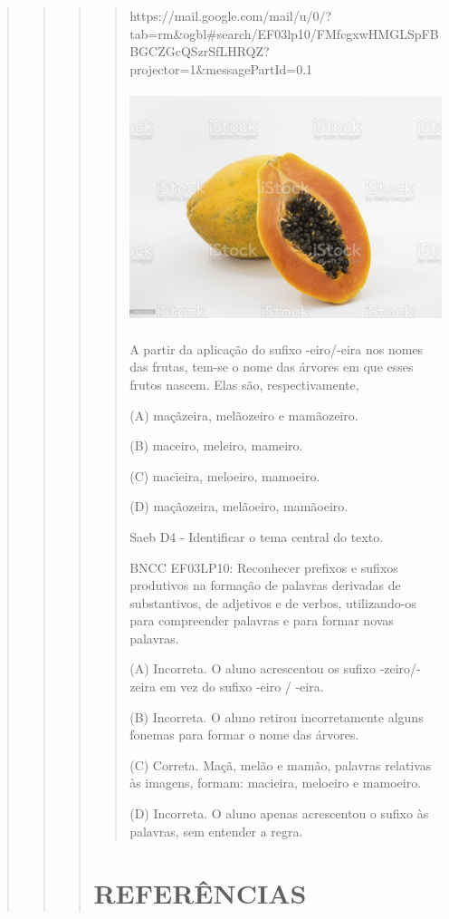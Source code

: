 \begin{quote}
\begin{quote}
\begin{quote}
\begin{quote}
https://mail.google.com/mail/u/0/?tab=rm\&ogbl\#search/EF03lp10/FMfcgxwHMGLSpFBBGCZGcQSzrSfLHRQZ?projector=1\&messagePartId=0.1

\includegraphics[width=3.76501in,height=2.67500in]{media/image40.jpeg}

A partir da aplicação do sufixo -eiro/-eira nos nomes das frutas, tem-se
o nome das árvores em que esses frutos nascem. Elas são,
respectivamente,

(A) maçãzeira, melãozeiro e mamãozeiro.

(B) maceiro, meleiro, mameiro.

(C) macieira, meloeiro, mamoeiro.

(D) maçãozeira, melãoeiro, mamãoeiro.

Saeb D4 - Identificar o tema central do texto.

BNCC EF03LP10: Reconhecer prefixos e sufixos produtivos na formação de
palavras derivadas de substantivos, de adjetivos e de verbos,
utilizando-os para compreender palavras e para formar novas palavras.

(A) Incorreta. O aluno acrescentou os sufixo -zeiro/-zeira em vez do
sufixo -eiro / -eira.

(B) Incorreta. O aluno retirou incorretamente alguns fonemas para formar
o nome das árvores.

(C) Correta. Maçã, melão e mamão, palavras relativas às imagens, formam:
macieira, meloeiro e mamoeiro.

(D) Incorreta. O aluno apenas acrescentou o sufixo às palavras, sem
entender a regra.
\end{quote}

\section{REFERÊNCIAS}\label{referuxeancias}


\end{quote}
\end{quote}
\end{quote}
